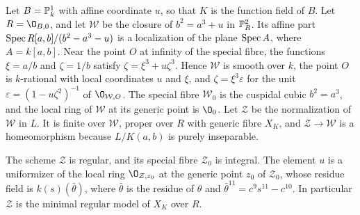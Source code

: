 Let $B = \mathbb{P}^1_k$ with affine coordinate $u$, so that $K$ is the function field of $B$.
Let $R = \O_{B,0}$, and let $\mathcal W$ be the closure of $b^2 = a^3+u$ in $\mathbb{P}^2_R$.
Its affine part $\operatorname{Spec} R[a,b]/(b^2-a^3-u)$ is a localization of the plane $\operatorname{Spec} A$, where $A = k[a,b]$.
Near the point $O$ at infinity of the special fibre, the functions $\xi = a/b$ and $\zeta = 1/b$ satisfy $\zeta = \xi^3+u\zeta^3$.
Hence $\mathcal W$ is smooth over $k$, the point $O$ is $k$-rational with local coordinates $u$ and $\xi$, and $\zeta = \xi^3\varepsilon$ for the unit $\varepsilon = (1-u\zeta^2)^{-1}$ of $\O_{\mathcal W,O}$.
The special fibre $\mathcal W_0$ is the cuspidal cubic $b^2 = a^3$, and the local ring of $\mathcal W$ at its generic point is $\O_0$.
Let $\mathcal Z$ be the normalization of $\mathcal W$ in $L$.
It is finite over $\mathcal W$, proper over $R$ with generic fibre $X_K$, and $\mathcal Z\to\mathcal W$ is a homeomorphism because $L/K(a,b)$ is purely inseparable.

\begin{lemma}\label{lem:p11-regular}
The scheme $\mathcal Z$ is regular, and its special fibre $\mathcal Z_0$ is integral.
The element $u$ is a uniformizer of the local ring $\O_{\mathcal Z,z_0}$ at the generic point $z_0$ of $\mathcal Z_0$, whose residue field is $k(s)(\bar\theta)$, where $\bar\theta$ is the residue of $\theta$ and $\bar\theta^{11} = c^9s^{11}-c^{10}$.
In particular $\mathcal Z$ is the minimal regular model of $X_K$ over $R$.
\end{lemma}

